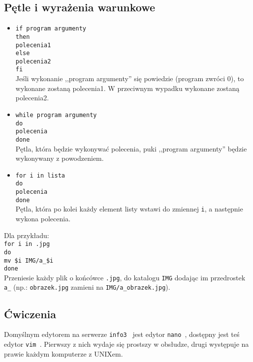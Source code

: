 \documentclass[polish]{instrukcja}
\begin{document}
\subsection{Pętle i wyrażenia warunkowe}
\begin{itemize}
\item {\tt if {\red program} {\green argumenty}\\
then\\
{\red polecenia1}\\
else\\
{\red polecenia2}\\
fi}\\
Jeśli wykonanie ,,{\red program} {\green argumenty}'' się powiedzie (program zwróci $0$), to wykonane zostaną {\red polecenia1}. W przeciwnym wypadku wykonane zostaną {\red polecenia2}.
\item {\tt while {\red program} {\green argumenty}\\
do\\
{\red polecenia}\\
done}\\
Pętla, która będzie wykonywać {\red polecenia}, puki ,,{\red program} {\green argumenty}'' będzie wykonywany z powodzeniem.
\item {\tt for i in {\green lista}\\
do\\
{\red polecenia}\\
done}\\
Pętla, która po kolei każdy element {\green list}y wstawi do zmiennej {\tt i}, a następnie wykona {\red polecenia}.
\end{itemize}

Dla przykładu:\\
{\tt for i in {\green *.jpg}\\
do\\
{\red mv} {\green \$i IMG/a\_\$i} \\
done}\\
Przeniesie każdy plik o końcówce {\tt .jpg}, do katalogu {\tt IMG} dodając im przedrostek {\tt a\_} (np.: {\tt obrazek.jpg} zamieni na {\tt IMG/a\_obrazek.jpg}).

\subsection{Ćwiczenia}

Domyślnym edytorem na serwerze {\tt info3 } jest edytor {\tt nano }, dostępny jest teś edytor {\tt vim }. Pierwszy z nich wydaje się prostszy w obsłudze, drugi występuje na prawie każdym komputerze z UNIXem.
\end{document}
